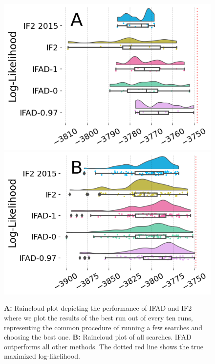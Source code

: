 \documentclass[numsec,webpdf,modern,medium,namedate]{oup-authoring-template}
\newcommand\arxiv[2]{#2} %
\theoremstyle{thmstyleone}%
\theoremstyle{thmstyletwo}%
\theoremstyle{thmstylethree}%
\begin{document}
\begin{figure}[ht]
    \centering
    \arxiv{}{\vspace*{0.1ex}}
    \includegraphics[width=\arxiv{8cm}{\textwidth/\real{2.2}}]{imgs/095/boxplot.png}
    \includegraphics[width=\arxiv{8cm}{\textwidth/\real{2.2}}]{imgs/095/boxplot_all.png}
    \caption{\textbf{A:} Raincloud plot depicting the performance of IFAD and IF2 where we plot the results of the best run out of every ten runs, representing the common procedure of running a few searches and choosing the best one. \textbf{B:} Raincloud plot of all searches. IFAD outperforms all other methods.
    The dotted red line shows the true maximized log-likelihood.}
    \label{fig:boxplot}
    \arxiv{}{\vspace*{-5mm}}
\end{figure}
\end{document}
